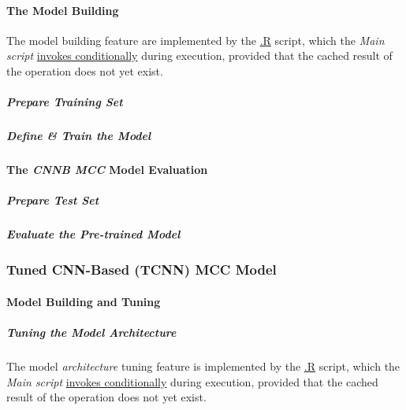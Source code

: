 \documentclass[
]{report}
\begin{document}
\paragraph{The Model Building}\label{cnnb.build}

The model building feature are implemented by the \href{}{.R} script, which the \emph{Main script} \href{https://github.com/AzKurban-edX-DS/edx.capstone.choose-your-own/blob/main/r/index.R\#L}{invokes conditionally} during execution, provided that the cached result of the operation does not yet exist.

\subparagraph{\texorpdfstring{Prepare \emph{Training Set}}{Prepare Training Set}}\label{cnnb.train_set.tuning}

\hfill\break

\subparagraph{Define \& Train the Model}\label{cnnb.train}

\hfill\break

\paragraph{\texorpdfstring{The \emph{CNNB MCC} Model Evaluation}{The CNNB MCC Model Evaluation}}\label{cnnb.evaluation}

\subparagraph{\texorpdfstring{Prepare \emph{Test Set}}{Prepare Test Set}}\label{cnnb.eval.test_set}

\hfill\break

\subparagraph{Evaluate the Pre-trained Model}\label{cnnb.best.eval}

\hfill\break

\subsubsection{Tuned CNN-Based (TCNN) MCC Model}\label{tuned-cnn-based-tcnn-mcc-model}

\paragraph{Model Building and Tuning}\label{tcnn.build}

\hfill\break

\subparagraph{\texorpdfstring{Tuning the Model \emph{Architecture}}{Tuning the Model Architecture}}\label{tcnn.arch.tuning}

\hfill\break

The model \emph{architecture} tuning feature is implemented by the \href{}{.R} script, which the \emph{Main script} \href{https://github.com/AzKurban-edX-DS/edx.capstone.choose-your-own/blob/main/r/index.R\#L}{invokes conditionally} during execution, provided that the cached result of the operation does not yet exist.
\end{document}
